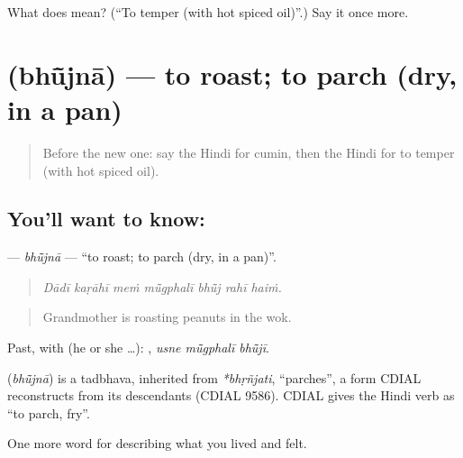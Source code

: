 \begin{tcolorbox}[breakable,colback=teal!4,colframe=teal!35!black,title={Before you move on}]
What does  mean? (\textquotedblleft{}To temper (with hot spiced oil)\textquotedblright{}.) Say it once more.
\end{tcolorbox}
\section[\texorpdfstring{\hi{भूँजना} (bhū̃jnā)}{भूँजना (bhū̃jnā)}]{ (bhū̃jnā) — to roast; to parch (dry, in a pan)}

\label{lesson:HI-C521-bhujna}



\begin{quote}
Before the new one: say the Hindi for cumin, then the Hindi for to temper (with hot spiced oil).
\end{quote}

\subsection*{You'll want to know: }
\textbf{} — \emph{bhū̃jnā} — \textquotedblleft{}to roast; to parch (dry, in a pan)\textquotedblright{}.

\begin{quote}
      
\end{quote}

\begin{quote}
\emph{Dādī kaṛāhī meṁ mū̃gphalī bhū̃j rahī haiṁ.}
\end{quote}

\begin{quote}
Grandmother is roasting peanuts in the wok.
\end{quote}

Past, with  (he or she …):   , \emph{usne mū̃gphalī bhū̃jī}.

\begin{cousinweb}
\textbf{} (\emph{bhū̃jnā}) is a tadbhava, inherited from \emph{*bhṛñjati}, \textquotedblleft{}parches\textquotedblright{}, a form CDIAL reconstructs from its descendants (CDIAL 9586). CDIAL gives the Hindi verb as \textquotedblleft{}to parch, fry\textquotedblright{}.
\end{cousinweb}

\begin{grammarlens}[title={What you've built}]
One more word for describing what you lived and felt.
\end{grammarlens}

